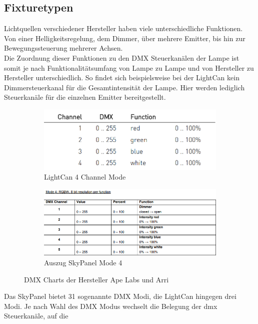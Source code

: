 \documentclass[11pt]{scrartcl}
\begin{document}
\subsection{Fixturetypen}
Lichtquellen verschiedener Hersteller haben viele unterschiedliche Funktionen. Von einer Helligkeitsregelung, dem Dimmer, über mehrere Emitter, bis hin zur
Bewegungssteuerung mehrerer Achsen.\\
Die Zuordnung dieser Funktionen zu den DMX Steuerkanälen der Lampe ist somit je nach Funktionalitätsumfang von Lampe zu Lampe und  von Hersteller zu Hersteller
unterschiedlich. So findet sich beispielsweise bei der LightCan kein Dimmersteuerkanal für die Gesamtintensität der Lampe. Hier werden lediglich Steuerkanäle für
die einzelnen Emitter bereitgestellt.
\begin{figure}[H]
    \centering
    \begin{subfigure}[b]{.49\textwidth}
        \includegraphics[width=\textwidth]{images/dmx_chart_light_can_4_channel_mode.png}
        \caption{LightCan 4 Channel Mode \cite{lightCanDMX}}
    \end{subfigure}
    \hfill 
    \begin{subfigure}[b]{.49\textwidth}
        \includegraphics[width=\textwidth]{images/dmx_chart_skypanel_mode_4.png}
        \caption{Auszug SkyPanel Mode 4 \cite{skypanelDMX}}
    \end{subfigure}
    \caption{DMX Charts der Hersteller Ape Labs und Arri}
\end{figure}
\noindent
Das SkyPanel bietet 31 sogenannte DMX Modi, die LightCan hingegen drei Modi. Je nach Wahl des DMX Modus wechselt die Belegung der \ac{dmx} Steuerkanäle, auf die
\end{document}
